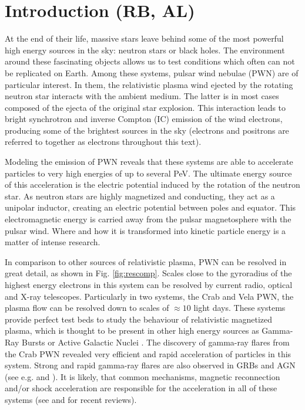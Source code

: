 \section{Introduction (RB, AL)}
At the end of their life, massive stars leave behind some of the most powerful high energy sources in the sky: neutron stars or black holes. The environment around these fascinating objects allows
us to test conditions which often can not be replicated on Earth. Among these systems, pulsar wind nebulae (PWN) are of particular interest. In them, the relativistic plasma wind ejected by the rotating neutron star interacts with the ambient medium. The latter is in most cases composed of the ejecta of the original star explosion. This interaction leads to bright synchrotron and inverse Compton (IC) emission of the wind electrons, producing some of the brightest sources in the sky (electrons and positrons are referred to together as electrons throughout this text).

Modeling the emission of PWN reveals that these systems are able to accelerate particles to very high energies of up to several PeV. The ultimate energy source of this acceleration is the electric potential induced by the rotation of the neutron star. As neutron stars are highly magnetized and conducting, they act as a unipolar inductor, creating an electric potential between poles and equator. This electromagnetic energy is carried away from the pulsar magnetosphere with the pulsar wind. Where and how it is transformed into kinetic particle energy is a matter of intense research.

In comparison to other sources of relativistic plasma, PWN can be resolved in great detail, as shown in Fig. \ref{fig:rescomp}. Scales close to the gyroradius of the highest energy electrons in this system can be resolved by current radio, optical and X-ray telescopes. Particularly in two systems, the Crab and Vela PWN, the plasma flow can be resolved down to scales of $\approx 10$ light days. These systems provide perfect test beds to study the behaviour of relativistic magnetized plasma, which is thought to be present in other high energy sources as Gamma-Ray Bursts or Active Galactic Nuclei \citep{Berger_2014,Massaro_2015}. The discovery of gamma-ray flares from the Crab PWN revealed very efficient and rapid acceleration of particles in this system. Strong and rapid gamma-ray flares are also observed in GRBs and AGN (see e.g. \citep{Ackermann_2013} and \citep{Aharonian_2009}). It is likely, that common mechanisms, magnetic reconnection and/or shock acceleration are responsible for the acceleration in all of these systems (see \citep{Kagan_2015} and \citep{Sironi_2015} for recent reviews).

